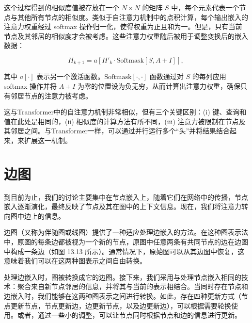 \documentclass[lang=cn,newtx,10pt,scheme=chinese]{elegantbook}
\begin{document}
这个过程得到的相似度值被存放在一个 \(N \times N\) 的矩阵 \(S\) 中，每个元素代表一个节点与其他所有节点的相似度。类似于自注意力机制中的点积计算，每个输出嵌入的注意力权重经过 softmax 操作归一化，使得权重为正且和为一。但是，只有当前节点及其邻居的相似度才会被考虑。这些注意力权重随后被用于调整变换后的嵌入数据：

\begin{equation}
H_{k+1} = a \left[ H'_k \cdot \text{Softmask}[S, A + I] \right], 
\end{equation}

其中 \(a[\cdot]\) 表示另一个激活函数。\(\text{Softmask}[\cdot,\cdot]\) 函数通过对 \(S\) 的每列应用 softmax 操作并将 \(A + I\) 为零的位置设为负无穷，从而计算出注意力权重，确保只有邻居节点的注意力被考虑。

这与Transformer中的自注意力机制非常相似，但有三个关键区别：(i) 键、查询和值在此处是相同的，(ii) 相似度的计算方法有所不同，(iii) 注意力被限制在节点及其邻居之间。与Transformer一样，可以通过并行运行多个“头”并将结果结合起来，来扩展这一机制。

\section{边图}
到目前为止，我们的讨论主要集中在节点嵌入上，随着它们在网络中的传播，节点嵌入逐渐演化，最终反映了节点及其在图中的上下文信息。现在，我们将注意力转向图中边上的信息。

边图（又称为伴随图或线图）提供了一种适应处理边嵌入的方法。在这种图表示法中，原图的每条边都被视为一个新的节点，原图中任意两条有共同节点的边在边图中构成一条边（如图 13.13 所示）。通常情况下，原始图可以从其边图中恢复，这意味着我们可以在这两种图表示之间自由转换。

处理边嵌入时，图被转换成它的边图。接下来，我们采用与处理节点嵌入相同的技术：聚合来自新节点邻居的信息，并将其与当前的表示相结合。当同时存在节点和边嵌入时，我们能够在这两种图表示之间进行转换。如此，存在四种更新方式（节点更新节点，节点更新边，边更新节点，以及边更新边），可以根据需要轮换使用。或者，通过一些小的调整，可以让节点同时根据节点和边的信息进行更新。
\end{document}
